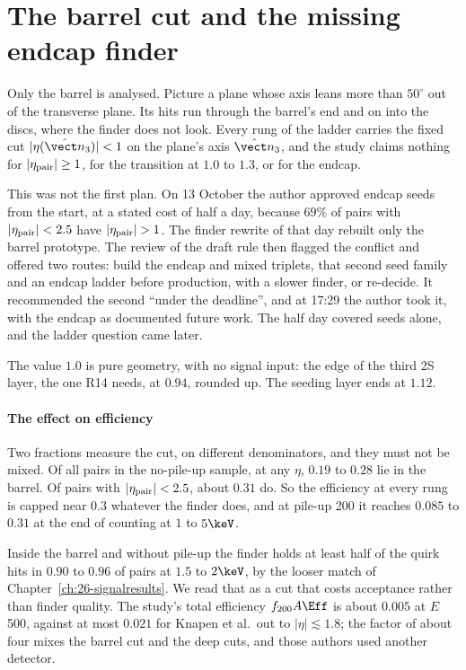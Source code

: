 \section{The barrel cut and the missing endcap finder}\label{sec:29-barrel}

Only the barrel is analysed. Picture a plane whose axis leans more than $50^\circ$ out of the transverse plane. Its hits run through the barrel's end and on into the discs, where the finder does not look. Every rung of the ladder carries the fixed cut $|\eta(\hat{\vect n}_3)|<1$ on the plane's axis $\hat{\vect n}_3$, and the study claims nothing for $|\eta_{\rm pair}|\ge1$, for the transition at $1.0$ to $1.3$, or for the endcap.

This was not the first plan. On 13 October the author approved endcap seeds from the start, at a stated cost of half a day, because $69\%$ of pairs with $|\eta_{\rm pair}|<2.5$ have $|\eta_{\rm pair}|>1$. The finder rewrite of that day rebuilt only the barrel prototype. The review of the draft rule then flagged the conflict and offered two routes: build the endcap and mixed triplets, that second seed family and an endcap ladder before production, with a slower finder, or re-decide. It recommended the second ``under the deadline'', and at 17:29 the author took it, with the endcap as documented future work. The half day covered seeds alone, and the ladder question came later.

The value $1.0$ is pure geometry, with no signal input: the edge of the third 2S layer, the one R14 needs, at $0.94$, rounded up. The seeding layer ends at $1.12$.

\paragraph{The effect on efficiency}
Two fractions measure the cut, on different denominators, and they must not be mixed. Of all pairs in the no-pile-up sample, at any $\eta$, $0.19$ to $0.28$ lie in the barrel. Of pairs with $|\eta_{\rm pair}|<2.5$, about $0.31$ do. So the efficiency at every rung is capped near $0.3$ whatever the finder does, and at pile-up 200 it reaches $0.085$ to $0.31$ at the end of counting at $1$ to $5\keV$.

Inside the barrel and without pile-up the finder holds at least half of the quirk hits in $0.90$ to $0.96$ of pairs at $1.5$ to $2\keV$, by the looser match of Chapter~\ref{ch:26-signalresults}. We read that as a cut that costs acceptance rather than finder quality. The study's total efficiency $f_{200}A\Eff$ is about $0.005$ at $E$ 500, against at most $0.021$ for Knapen et al.\ out to $|\eta|\lesssim1.8$; the factor of about four mixes the barrel cut and the deep cuts, and those authors used another detector.

